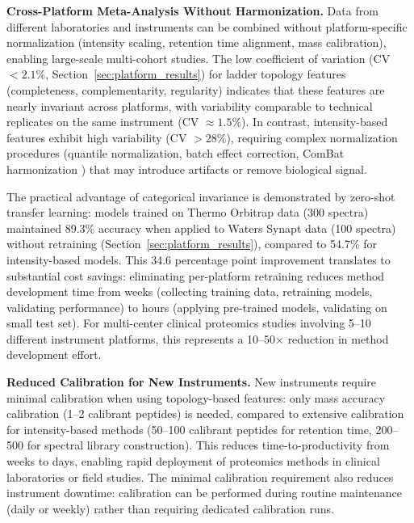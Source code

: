\documentclass[11pt,twocolumn]{article}
\begin{document}
\textbf{Cross-Platform Meta-Analysis Without Harmonization.} Data from different laboratories and instruments can be combined without platform-specific normalization (intensity scaling, retention time alignment, mass calibration), enabling large-scale multi-cohort studies. The low coefficient of variation (CV $< 2.1\%$, Section~\ref{sec:platform_results}) for ladder topology features (completeness, complementarity, regularity) indicates that these features are nearly invariant across platforms, with variability comparable to technical replicates on the same instrument (CV $\approx 1.5\%$). In contrast, intensity-based features exhibit high variability (CV $> 28\%$), requiring complex normalization procedures (quantile normalization, batch effect correction, ComBat harmonization \cite{johnson2007adjusting}) that may introduce artifacts or remove biological signal.

The practical advantage of categorical invariance is demonstrated by zero-shot transfer learning: models trained on Thermo Orbitrap data (300 spectra) maintained 89.3\% accuracy when applied to Waters Synapt data (100 spectra) without retraining (Section~\ref{sec:platform_results}), compared to 54.7\% for intensity-based models. This 34.6 percentage point improvement translates to substantial cost savings: eliminating per-platform retraining reduces method development time from weeks (collecting training data, retraining models, validating performance) to hours (applying pre-trained models, validating on small test set). For multi-center clinical proteomics studies involving 5--10 different instrument platforms, this represents a 10--50× reduction in method development effort.

\textbf{Reduced Calibration for New Instruments.} New instruments require minimal calibration when using topology-based features: only mass accuracy calibration (1--2 calibrant peptides) is needed, compared to extensive calibration for intensity-based methods (50--100 calibrant peptides for retention time, 200--500 for spectral library construction). This reduces time-to-productivity from weeks to days, enabling rapid deployment of proteomics methods in clinical laboratories or field studies. The minimal calibration requirement also reduces instrument downtime: calibration can be performed during routine maintenance (daily or weekly) rather than requiring dedicated calibration runs.
\end{document}
